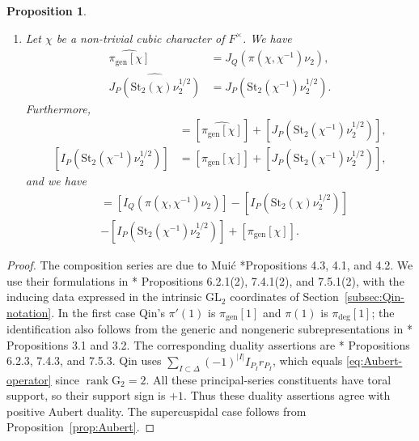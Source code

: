 \documentclass[12pt]{amsart}
\theoremstyle{definition}
\theoremstyle{plain}
\newtheorem{proposition}[definition]{Proposition}
\theoremstyle{remark}
\def\GL{\mathrm{GL}}
\numberwithin{equation}{section}
\newcommand{\gen}{\mathrm{gen}}
\newcommand{\rG}{\mathrm{G}}
\newcommand{\St}{\mathrm{St}}
\begin{document}
\begin{proposition}
\begin{enumerate}
      \item
      Let $\chi$ be a non-trivial cubic character of $F^{\times}$.
      We have
      \begin{align*}
            \widehat{\pi_{\gen}[\chi]} &= J_Q(\pi(\chi, \chi^{-1}) \nu_2), \\
            \widehat{J_P(\St_2(\chi)\nu_2^{1/2})} &= J_P(\St_2(\chi^{-1})\nu_2^{1/2}).
      \end{align*}
      Furthermore, 
      \begin{align*}
            [I_P(\chi \circ \det \nu_2^{1/2})] &= 
            [\widehat{\pi_{\gen}[\chi]}] + [J_P(\St_2(\chi^{-1})\nu_2^{1/2})], \\
            [I_P(\St_2(\chi^{-1})\nu_2^{1/2})] &=
            [\pi_{\gen}[\chi]] + [J_P(\St_2(\chi^{-1})\nu_2^{1/2})],
      \end{align*}
      and we have
      \begin{align*}
            [J_Q(\pi(\chi, \chi^{-1}) \nu_2)]
             &= [I_Q(\pi(\chi, \chi^{-1})\nu_2)] - [I_P(\St_2(\chi)\nu_2^{1/2})] \\
             &- 
             [I_P(\St_{2}(\chi^{-1})\nu_2^{1/2})] + [\pi_{\mathrm{gen}}[\chi]].
      \end{align*}
      \end{enumerate}
\end{proposition}

\begin{proof}
      The composition series are due to Mui\'c
      \cite{Muic1997-UnitaryDualG2}*{Propositions 4.3, 4.1, and 4.2}.
      We use their formulations in
      \cite{Qin2026-AubertZelevinskyInvolutionG2HeckeAlgebras}*{
      Propositions 6.2.1(2), 7.4.1(2), and 7.5.1(2)}, with the
      inducing data expressed in the intrinsic $\GL_2$ coordinates of
      Section~\ref{subsec:Qin-notation}.
      In the first case Qin's $\pi'(1)$ is $\pi_{\gen}[1]$ and $\pi(1)$ is $\pi_{\deg}[1]$;
      the identification also follows from the generic and nongeneric
      subrepresentations in
      \cite{GanSavin2023-HoweDualityDichotomyExceptionalThetaCorrespondences}*{
      Propositions 3.1 and 3.2}.
      The corresponding duality assertions are
      \cite{Qin2026-AubertZelevinskyInvolutionG2HeckeAlgebras}*{
      Propositions 6.2.3, 7.4.3, and 7.5.3}. Qin uses
      $\sum_{I\subset\Delta}(-1)^{|I|}I_{P_I}r_{P_I}$, which equals
      \eqref{eq:Aubert-operator} since $\operatorname{rank}{\rG_2}=2$.
      All these principal-series constituents have toral support, so their
      support sign is $+1$. Thus these duality assertions agree with positive
      Aubert duality. The supercuspidal case follows from
      Proposition~\ref{prop:Aubert}.
\end{proof}
\end{document}
